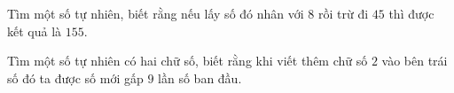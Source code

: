 \begin{ex}
  Tìm một số tự nhiên, biết rằng nếu lấy số đó nhân với $8$ rồi trừ đi $45$ thì được kết quả là $155$.
\end{ex}

\begin{ex}
  Tìm một số tự nhiên có hai chữ số, biết rằng khi viết thêm chữ số $2$ vào bên trái số đó ta được số mới gấp $9$ lần số ban đầu.
\end{ex}
